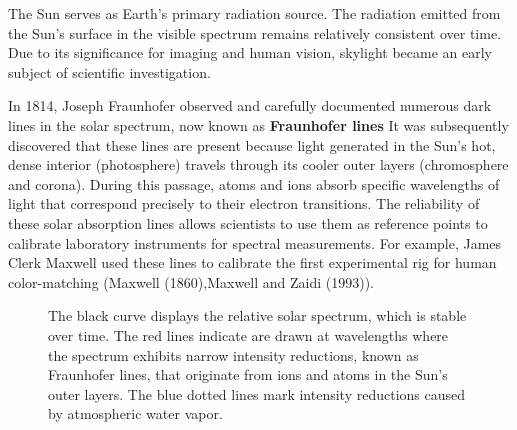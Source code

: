 \documentclass[
  letterpaper,
]{book}
\begin{document}
The Sun serves as Earth's primary radiation source. The radiation
emitted from the Sun's surface in the visible spectrum remains
relatively consistent over time. Due to its significance for imaging and
human vision, skylight became an early subject of scientific
investigation.

In 1814, Joseph Fraunhofer observed and carefully documented numerous
dark lines in the solar spectrum, now known as \textbf{Fraunhofer lines}
It was subsequently discovered that these lines are present because
light generated in the Sun's hot, dense interior (photosphere) travels
through its cooler outer layers (chromosphere and corona). During this
passage, atoms and ions absorb specific wavelengths of light that
correspond precisely to their electron transitions. The reliability of
these solar absorption lines allows scientists to use them as reference
points to calibrate laboratory instruments for spectral measurements.
For example, James Clerk Maxwell used these lines to calibrate the first
experimental rig for human color-matching (Maxwell (1860),Maxwell and
Zaidi (1993)).

\begin{figure}


\caption{\label{fig-solarspectrum}The black curve displays the relative
solar spectrum, which is stable over time. The red lines indicate are
drawn at wavelengths where the spectrum exhibits narrow intensity
reductions, known as Fraunhofer lines, that originate from ions and
atoms in the Sun's outer layers. The blue dotted lines mark intensity
reductions caused by atmospheric water vapor.}

\end{figure}%
\end{document}
